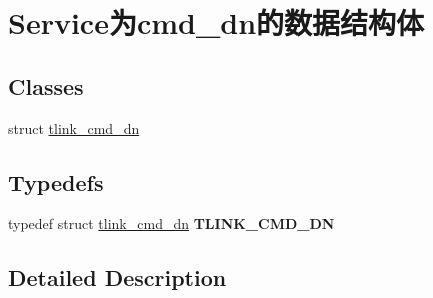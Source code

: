 \hypertarget{group__service_xE4_xB8_xBAcmd__dn_xE7_x9A_x84_xE6_x95_xB0_xE6_x8D_xAE_xE7_xBB_x93_xE6_x9E_x84_xE4_xBD_x93}{}\section{Service为cmd\+\_\+dn的数据结构体}
\label{group__service_xE4_xB8_xBAcmd__dn_xE7_x9A_x84_xE6_x95_xB0_xE6_x8D_xAE_xE7_xBB_x93_xE6_x9E_x84_xE4_xBD_x93}
\subsection*{Classes}
\begin{DoxyCompactItemize}
\item 
struct \mbox{\hyperlink{structtlink__cmd__dn}{tlink\+\_\+cmd\+\_\+dn}}
\end{DoxyCompactItemize}
\subsection*{Typedefs}
\begin{DoxyCompactItemize}
\item 
\mbox{\label{group__service_xE4_xB8_xBAcmd__dn_xE7_x9A_x84_xE6_x95_xB0_xE6_x8D_xAE_xE7_xBB_x93_xE6_x9E_x84_xE4_xBD_x93_ga70cf1c832e040599f153af01f19eecea}} 
typedef struct \mbox{\hyperlink{structtlink__cmd__dn}{tlink\+\_\+cmd\+\_\+dn}} {\bfseries T\+L\+I\+N\+K\+\_\+\+C\+M\+D\+\_\+\+DN}
\end{DoxyCompactItemize}


\subsection{Detailed Description}
